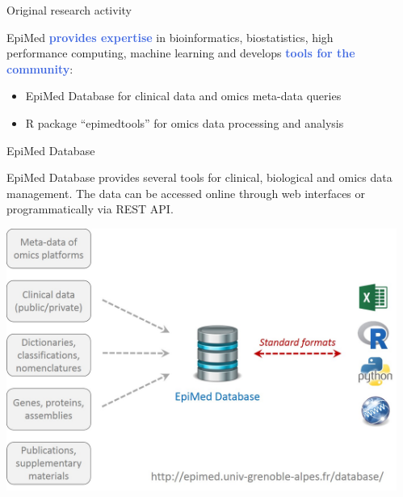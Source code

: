 \documentclass[final]{beamer}
\newlength{\sepwid}
\newlength{\twocolwid}
\begin{document}
\begin{frame}[t]
\begin{columns}[t]
\begin{column}{\twocolwid}
\begin{block}{Original research activity}
\vspace{1cm}

EpiMed \textcolor{RoyalBlue}{\textbf{provides expertise}} in bioinformatics, biostatistics, high performance computing, machine learning and develops \textcolor{RoyalBlue}{\textbf{tools for the community}}:
\begin{itemize}
\item EpiMed Database for clinical data and omics meta-data queries
\item R package “epimedtools” for omics data processing and analysis
\end{itemize}

\end{block}


\begin{block}{EpiMed Database}

EpiMed Database provides several tools for clinical, biological and omics data management. The data can be accessed online through web interfaces or programmatically via REST API.

\vspace{1cm}

\begin{center}
	\includegraphics[width=\linewidth]{figs/epimed_database.jpg}
\end{center}

\end{block}

\end{column} 

\begin{column}{\sepwid}\end{column} %


\end{columns}
\end{frame}
\end{document}
